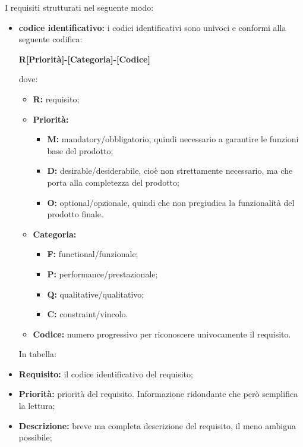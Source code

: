 
I requisiti strutturati nel seguente modo:

\begin{itemize}

	\item \textbf{codice identificativo:} i codici identificativi sono univoci e conformi alla seguente codifica:
	\begin{center}
		\textbf{R[Priorità]-[Categoria]-[Codice]}
	\end{center}
	dove:
		\begin{itemize}
			\item \textbf{R:} requisito;
			\item \textbf{Priorità:}
			\begin{itemize}
				\item \textbf{M:} mandatory/obbligatorio, quindi necessario a garantire le funzioni base del prodotto;
				\item \textbf{D:} desirable/desiderabile, cioè non strettamente necessario, ma che porta alla completezza del prodotto;
				\item \textbf{O:} optional/opzionale, quindi che non pregiudica la funzionalità del prodotto finale.
			\end{itemize}
			\item \textbf{Categoria:}
			\begin{itemize}
				\item \textbf{F:} functional/funzionale;
				\item \textbf{P:} performance/prestazionale;
				\item \textbf{Q:} qualitative/qualitativo;
				\item \textbf{C:} constraint/vincolo.
			\end{itemize}
			\item \textbf{Codice:} numero progressivo per riconoscere univocamente il requisito. \\
		\end{itemize}
	\noindent In tabella:
	\item \textbf{Requisito:} il codice identificativo del  requisito;
	\item \textbf{Priorità:} priorità del requisito. Informazione ridondante che però semplifica la lettura;

	\item \textbf{Descrizione:} breve ma completa descrizione del requisito, il meno ambigua possibile;


\end{itemize}
